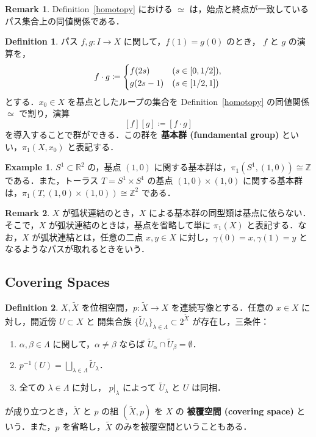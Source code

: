 \documentclass[dvipdfmx]{ujarticle}
\theoremstyle{definition}
\newtheorem{dfn}{Definition}[section]
\newtheorem*{rem*}{Remark}
\newtheorem*{ex*}{Example}
\begin{document}
\begin{rem*}
  Definition~\ref{homotopy} における $\simeq$ は，始点と終点が一致しているパス集合上の同値関係である．
\end{rem*}

\begin{dfn}
  パス $f,g\colon I\rightarrow X$ に関して，$f(1)=g(0)$ のとき， $f$ と $g$ の演算を，
\[
f \cdot g \coloneqq
\begin{cases}
    f(2s) \vphantom{g} & (s \in [0, 1/2]), \\
    g(2s - 1) & (s \in [1/2, 1])
\end{cases}
\]
  とする．$x_0\in X$ を基点としたループの集合を Definition~\ref{homotopy} の同値関係 $\simeq$ で割り，演算
  $$[f][g]\coloneqq[f\cdot g]$$
  を導入することで群ができる．この群を \textbf{基本群 (fundamental group)} といい，$\pi_1(X,x_0)$ と表記する．
\end{dfn}

\begin{ex*}
  $S^1\subset \mathbb{R}^2$ の，基点 $(1,0)$ に関する基本群は，$\pi_1(S^1,(1,0))\cong \mathbb{Z}$ である．また，トーラス $T=S^1\times S^1$ の基点 $(1,0)\times (1,0)$ に関する基本群は，$\pi_1(T,(1,0)\times (1,0))\cong \mathbb{Z}^2$ である．
\end{ex*}

\begin{rem*}
  $X$ が弧状連結のとき，$X$ による基本群の同型類は基点に依らない．そこで，$X$ が弧状連結のときは，基点を省略して単に $\pi_1(X)$ と表記する．なお，$X$ が弧状連結とは，任意の二点 $x,y\in X$ に対し，$\gamma(0)=x,\gamma(1)=y$ となるようなパスが取れるときをいう．
\end{rem*}

\subsection{Covering Spaces}\label{coveringspace}
\begin{dfn}
   $X,\widetilde{X}$ を位相空間，$p\colon\widetilde{X}\rightarrow X$ を連続写像とする．任意の $x\in X$ に対し，開近傍 $U\subset X$ と 開集合族 $\{\widetilde{U}_\lambda\}_{\lambda\in\Lambda}\subset 2^{\widetilde{X}}$ が存在し，三条件：
  \begin{enumerate}
    \item $\alpha,\beta\in\Lambda$ に関して，$\alpha\neq\beta$ ならば $\widetilde{U}_\alpha\cap\widetilde{U}_\beta=\emptyset$．
    \item $p^{-1}(U)=\bigsqcup_{\lambda\in\Lambda}\widetilde{U}_\lambda$．
    \item 全ての $\lambda\in\Lambda$ に対し， $p|_\lambda$ によって $\widetilde{U}_\lambda$ と $U$ は同相．
  \end{enumerate}
  が成り立つとき，$\widetilde{X}$ と $p$ の組 $(\widetilde{X},p)$ を $X$ の \textbf{被覆空間 (covering space)} という．また，$p$ を省略し，$\widetilde{X}$ のみを被覆空間ということもある．
\end{dfn}
\end{document}
